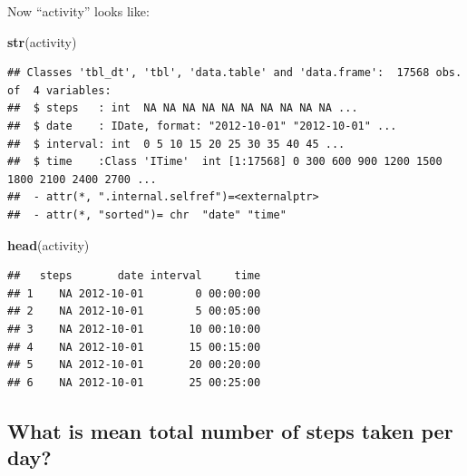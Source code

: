 \documentclass[]{article}
\newenvironment{Shaded}{\begin{snugshade}}{\end{snugshade}}
\newcommand{\KeywordTok}[1]{\textcolor[rgb]{0.13,0.29,0.53}{\textbf{{#1}}}}
\newcommand{\DataTypeTok}[1]{\textcolor[rgb]{0.13,0.29,0.53}{{#1}}}
\newcommand{\DecValTok}[1]{\textcolor[rgb]{0.00,0.00,0.81}{{#1}}}
\newcommand{\StringTok}[1]{\textcolor[rgb]{0.31,0.60,0.02}{{#1}}}
\newcommand{\NormalTok}[1]{{#1}}
\begin{document}
\begin{Shaded}
\end{Shaded}

Now ``activity'' looks like:

\begin{Shaded}
\begin{Highlighting}[]
\KeywordTok{str}\NormalTok{(activity)}
\end{Highlighting}
\end{Shaded}

\begin{verbatim}
## Classes 'tbl_dt', 'tbl', 'data.table' and 'data.frame':  17568 obs. of  4 variables:
##  $ steps   : int  NA NA NA NA NA NA NA NA NA NA ...
##  $ date    : IDate, format: "2012-10-01" "2012-10-01" ...
##  $ interval: int  0 5 10 15 20 25 30 35 40 45 ...
##  $ time    :Class 'ITime'  int [1:17568] 0 300 600 900 1200 1500 1800 2100 2400 2700 ...
##  - attr(*, ".internal.selfref")=<externalptr> 
##  - attr(*, "sorted")= chr  "date" "time"
\end{verbatim}

\begin{Shaded}
\begin{Highlighting}[]
\KeywordTok{head}\NormalTok{(activity)}
\end{Highlighting}
\end{Shaded}

\begin{verbatim}
##   steps       date interval     time
## 1    NA 2012-10-01        0 00:00:00
## 2    NA 2012-10-01        5 00:05:00
## 3    NA 2012-10-01       10 00:10:00
## 4    NA 2012-10-01       15 00:15:00
## 5    NA 2012-10-01       20 00:20:00
## 6    NA 2012-10-01       25 00:25:00
\end{verbatim}

\subsection{What is mean total number of steps taken per
day?}\label{what-is-mean-total-number-of-steps-taken-per-day}
\end{document}
